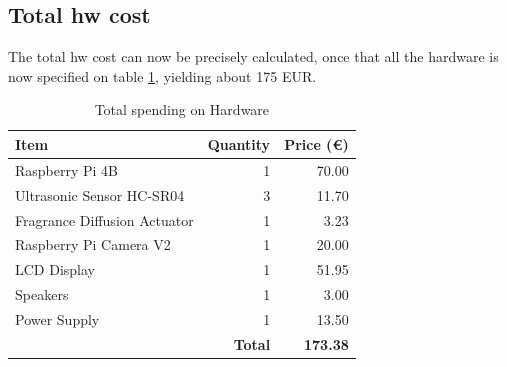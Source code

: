 \subsection{Total \gls{hw} cost}

The total \gls{hw} cost can now be precisely calculated, once that all the
hardware is now specified on table \ref{tab:hw-costs}, yielding about 175 EUR.

\begingroup
\renewcommand{\arraystretch}{0.7} %
\begin{table}[!hbt]
\centering
\caption{Total spending on Hardware}
\label{tab:hw-costs}
\begin{tabular}{@{}lrr@{}}
\toprule
\textbf{Item}                & \multicolumn{1}{l}{\textbf{Quantity}} & \multicolumn{1}{l}{\textbf{Price (€)}} \\ \midrule
Raspberry Pi 4B              & 1                                     & 70.00                                  \\ \midrule
Ultrasonic Sensor HC-SR04    & 3                                     & 11.70                                  \\ \midrule
Fragrance Diffusion Actuator & 1                                     & 3.23                                   \\ \midrule
Raspberry Pi Camera V2       & 1                                     & 20.00                                  \\ \midrule
LCD Display                  & 1                                     & 51.95                                  \\ \midrule
Speakers                     & 1                                     & 3.00                                   \\ \midrule
Power Supply                 & 1                                     & 13.50                                  \\ \midrule
\multicolumn{2}{r}{\textbf{Total}}                                   & \textbf{173.38}                        \\ \bottomrule
\end{tabular}
\end{table}
